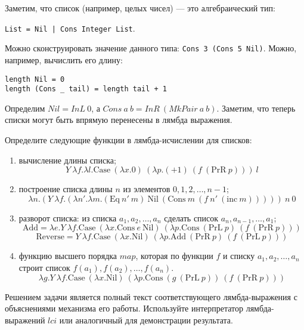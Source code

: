 \begin{enumerate}
          Заметим, что список (например, целых чисел) — это алгебраический тип:

          \verb!List = Nil | Cons Integer List!.

          Можно сконструировать значение данного типа: \verb!Cons 3 (Cons 5 Nil)!.
          Можно, например, вычислить его длину:
          \begin{verbatim}
length Nil = 0
length (Cons _ tail) = length tail + 1
\end{verbatim}

          Определим $Nil = InL\ 0$, а $Cons\ a\ b = InR\ (MkPair\ a\ b)$. Заметим, что теперь списки могут быть впрямую
          перенесены в лямбда выражения.

          Определите следующие функции в лямбда-исчислении для списков:
          \begin{enumerate}
              \item вычисление длины списка;
                    \[Y\ \lambda f.\lambda l.\mathrm{Case}\ (\lambda x.0)\ (\lambda p.( + 1)\ (f\ (\mathrm{PrR}\ p)))\ l\]
              \item построение списка длины $n$ из элементов $0, 1, 2, \dots, n-1$;
                    \[\lambda n.(Y\ \lambda f.(\lambda n'.\lambda m.(\mathrm{Eq}\ n'\ m)\ \mathrm{Nil}\ (\mathrm{Cons}\ m\ (f\ n'\ (\mathrm{inc}\ m)))))\ n\ 0\]
              \item разворот списка: из списка $a_1, a_2, \dots, a_n$ сделать список $a_n, a_{n-1}, \dots, a_1$;
                    \[\mathrm{Add} = \lambda e.Y\ \lambda f.\mathrm{Case}\ (\lambda x.\mathrm{Cons}\ e\ \mathrm{Nil})\ (\lambda p.\mathrm{Cons}\ (\mathrm{PrL}\ p)\ (f\ (\mathrm{PrR}\ p)))\]
                    \[\mathrm{Reverse} = Y\ \lambda f.\mathrm{Case}\ (\lambda x.\mathrm{Nil})\ (\lambda p.\mathrm{Add}\ (\mathrm{PrR}\ p)\ (f\
                        (\mathrm{PrL}\ p)))\]
              \item функцию высшего порядка $map$, которая по функции $f$ и списку $a_1, a_2, \dots, a_n$
                    строит список $f(a_1), f(a_2), \dots, f(a_n)$.
                    \[\lambda g.Y\ \lambda f.\mathrm{Case}\ (\lambda x.\mathrm{Nil})\ (\lambda p.\mathrm{Cons}\ (g\ (\mathrm{PrL}\ p))\ (f\ (\mathrm{PrR}\ p)))\]
          \end{enumerate}

          Решением задачи является полный текст соответствующего лямбда-выражения с объяснениями механизма его работы.
          Используйте интерпретатор лямбда-выражений $lci$ или аналогичный для демонстрации результата.


\end{enumerate}
